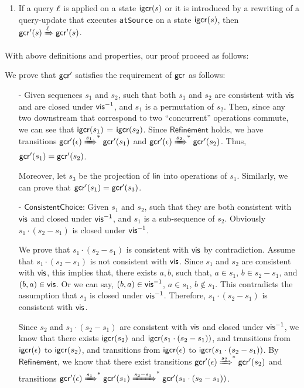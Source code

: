 {\begin{itemize}
\begin{enumerate}
\item If a query $\ell$ is applied on a state $\mathsf{igcr}(s)$ or it is introduced by a rewriting of a query-update that executes \lstinline|atSource| on a state $\mathsf{igcr}(s)$, then $\mathsf{gcr}'(s)\xRightarrow{\ensuremath{\ell}}\mathsf{gcr}'(s)$.
\end{enumerate}
\end{itemize}

With above definitions and properties, our proof proceed as follows:

 We prove that $\mathsf{gcr}'$ satisfies the requirement of $\mathsf{gcr}$ as follows:

\begin{itemize}
\setlength{\itemsep}{0.5pt}
\item[-] Given sequences $s_1$ and $s_2$, such that both $s_1$ and $s_2$ are consistent with $\mathsf{vis}$ and are closed under $\mathsf{vis}^{-1}$, and $s_1$ is a permutation of $s_2$. Then, since any two downstream that correspond to two ``concurrent'' operations commute, we can see that $\mathsf{igcr}(s_1)$ = $\mathsf{igcr}(s_2)$. Since $\mathsf{Refinement}$ holds, we have transitions $\mathsf{gcr}'(\epsilon)\xRightarrow{s_1}^*\mathsf{gcr}'(s_1)$ and $\mathsf{gcr}'(\epsilon)\xRightarrow{s_2}^*\mathsf{gcr}'(s_2)$. Thus, $\mathsf{gcr}'(s_1) = \mathsf{gcr}'(s_2)$.

    Moreover, let $s_3$ be the projection of $\mathsf{lin}$ into operations of $s_1$. Similarly, we can prove that $\mathsf{gcr}'(s_1) = \mathsf{gcr}'(s_3)$.

\item[-] $\mathsf{ConsistentChoice}$: Given $s_1$ and $s_2$, such that they are both consistent with $\mathsf{vis}$ and closed under $\mathsf{vis}^{-1}$, and $s_1$ is a sub-sequence of $s_2$. Obviously $s_1 \cdot (s_2 - s_1)$ is closed under $\mathsf{vis}^{-1}$.

    We prove that $s_1 \cdot (s_2 - s_1)$ is consistent with $\mathsf{vis}$ by contradiction. Assume that $s_1 \cdot (s_2 - s_1)$ is not consistent with $\mathsf{vis}$. Since $s_1$ and $s_2$ are consistent with $\mathsf{vis}$, this implies that, there exists $a,b$, such that, $a \in s_1$, $b \in s_2 - s_1$, and $(b,a) \in \mathsf{vis}$. Or we can say, $(b,a) \in \mathsf{vis}^{-1}$, $a \in s_1$, $b \notin s_1$. This contradicts the assumption that $s_1$ is closed under $\mathsf{vis}^{-1}$. Therefore, $s_1 \cdot (s_2 - s_1)$ is consistent with $\mathsf{vis}$.

    Since $s_2$ and $s_1 \cdot (s_2 - s_1)$ are consistent with $\mathsf{vis}$ and closed under $\mathsf{vis}^{-1}$, we know that there exists $\mathsf{igcr}(s_2)$ and $\mathsf{igcr}(s_1 \cdot (s_2 - s_1))$, and transitions from $\mathsf{igcr}(\epsilon)$ to $\mathsf{igcr}(s_2)$, and transitions from $\mathsf{igcr}(\epsilon)$ to $\mathsf{igcr}(s_1 \cdot (s_2 - s_1))$. By $\mathsf{Refinement}$, we know that there exist transitions $\mathsf{gcr}'(\epsilon)\xRightarrow{s_2}^*\mathsf{gcr}'(s_2)$ and transitions $\mathsf{gcr}'(\epsilon)\xRightarrow{s_1}^*\mathsf{gcr}'(s_1)\xRightarrow{s_2 - s_1}^*\mathsf{gcr}'(s_1 \cdot (s_2 - s_1))$.


\end{itemize}}
